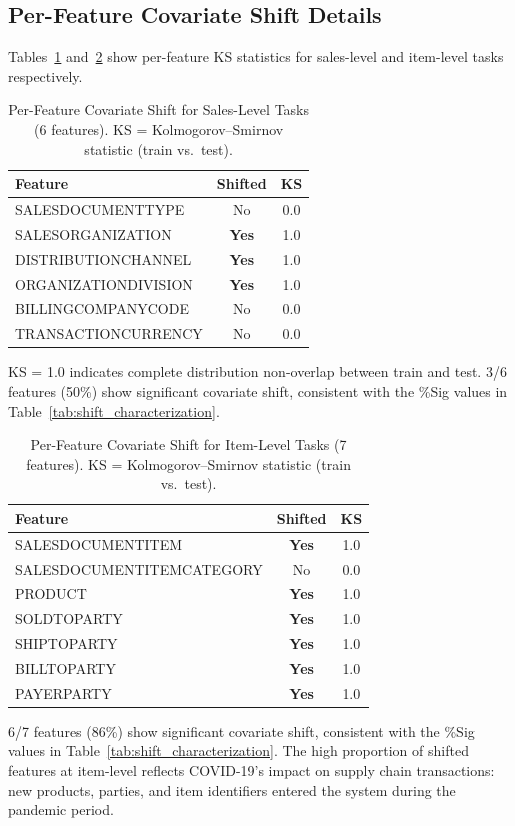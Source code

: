 \documentclass[accepted]{uai2026} %
\begin{document}
\subsection{Per-Feature Covariate Shift Details}\label{app:perfeature_shift}

Tables~\ref{tab:sales_feature_shift} and~\ref{tab:item_feature_shift} show per-feature KS statistics for sales-level and item-level tasks respectively.

\begin{table}[htbp]
\centering
\caption{Per-Feature Covariate Shift for Sales-Level Tasks (6 features). KS = Kolmogorov--Smirnov statistic (train vs.\ test).}\label{tab:sales_feature_shift}
\small
\begin{tabular}{@{}lcc@{}}
\toprule
Feature & Shifted & KS \\
\midrule
SALESDOCUMENTTYPE & No & 0.0 \\
SALESORGANIZATION & \textbf{Yes} & 1.0 \\
DISTRIBUTIONCHANNEL & \textbf{Yes} & 1.0 \\
ORGANIZATIONDIVISION & \textbf{Yes} & 1.0 \\
BILLINGCOMPANYCODE & No & 0.0 \\
TRANSACTIONCURRENCY & No & 0.0 \\
\bottomrule
\end{tabular}


\raggedright
\footnotesize
KS = 1.0 indicates complete distribution non-overlap between train and test. 3/6 features (50\%) show significant covariate shift, consistent with the \%Sig values in Table~\ref{tab:shift_characterization}.
\end{table}

\begin{table}[htbp]
\centering
\caption{Per-Feature Covariate Shift for Item-Level Tasks (7 features). KS = Kolmogorov--Smirnov statistic (train vs.\ test).}\label{tab:item_feature_shift}
\small
\begin{tabular}{@{}lcc@{}}
\toprule
Feature & Shifted & KS \\
\midrule
SALESDOCUMENTITEM & \textbf{Yes} & 1.0 \\
SALESDOCUMENTITEMCATEGORY & No & 0.0 \\
PRODUCT & \textbf{Yes} & 1.0 \\
SOLDTOPARTY & \textbf{Yes} & 1.0 \\
SHIPTOPARTY & \textbf{Yes} & 1.0 \\
BILLTOPARTY & \textbf{Yes} & 1.0 \\
PAYERPARTY & \textbf{Yes} & 1.0 \\
\bottomrule
\end{tabular}


\raggedright
\footnotesize
6/7 features (86\%) show significant covariate shift, consistent with the \%Sig values in Table~\ref{tab:shift_characterization}. The high proportion of shifted features at item-level reflects COVID-19's impact on supply chain transactions: new products, parties, and item identifiers entered the system during the pandemic period.
\end{table}
\end{document}
